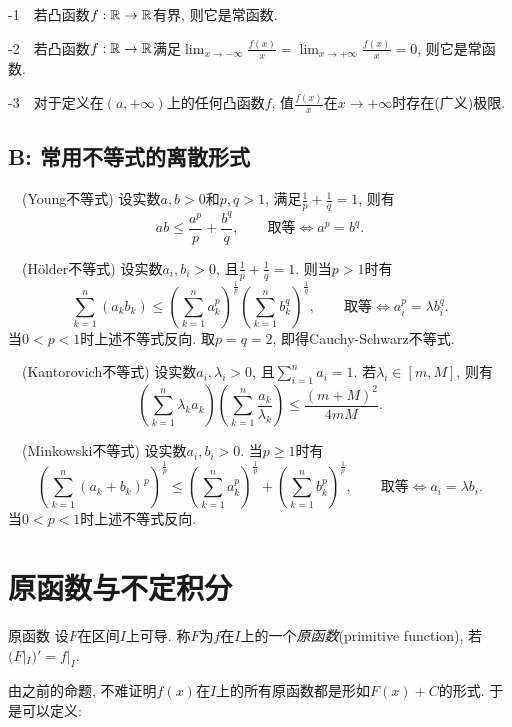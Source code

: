 -1~~若凸函数$f:\mathbb{R} \to \mathbb{R}$有界, 则它是常函数. 

-2~~若凸函数$f:\mathbb{R} \to \mathbb{R}$满足$\lim_{x \to -\infty} \frac{f(x)}{x} = \lim_{x \to +\infty} \frac{f(x)}{x} =0$, 则它是常函数. 

-3~~对于定义在$(a,+\infty)$上的任何凸函数$f$, 值$\frac{f(x)}{x}$在$x \to +\infty$时存在(广义)极限. 

\subsection*{B: 常用不等式的离散形式}

~~(Young不等式) 设实数$a,b>0$和$p,q>1$, 满足$\frac{1}{p} + \frac{1}{q} =1$, 则有$$ab \leq \frac{a^p}{p} + \frac{b^q}{q},\qquad \textit{取等} \Leftrightarrow a^p=b^q.$$

~~(Hölder不等式) 设实数$a_i,b_i>0$, 且$\frac{1}{p}+\frac{1}{q}=1$. 则当$p > 1$时有$$\sum_{k=1}^{n}(a_kb_k) \leq \left( \sum_{k=1}^{n} a_k^p \right)^{\frac{1}{p}} \left( \sum_{k=1}^{n} b_k^q \right)^{\frac{1}{q}},\qquad \textit{取等}\Leftrightarrow a_i^{p}=\lambda b_i^q. $$
当$0<p<1$时上述不等式反向. 取$p=q=2$, 即得Cauchy-Schwarz不等式. 
\vspace{1em}

~~(Kantorovich不等式) 设实数$a_i,\lambda _i>0$, 且$\sum_{i=1}^{n}a_i=1$. 若$\lambda _i \in [m,M]$, 则有$$\left( \sum_{k=1}^{n} \lambda _k a_k \right) \left( \sum_{k=1}^{n} \frac{a_k}{\lambda _k} \right) \leq \frac{(m+M)^2}{4mM}.$$

~~(Minkowski不等式) 设实数$a_i,b_i>0$. 当$p \geq 1$时有$$\left( \sum_{k=1}^{n} (a_k+b_k)^p \right)^{\frac{1}{p}} \leq \left( \sum_{k=1}^{n} a_k^p \right)^{\frac{1}{p}} + \left( \sum_{k=1}^{n} b_k^p \right)^{\frac{1}{p}},\qquad \textit{取等}\Leftrightarrow a_i=\lambda b_i.$$
当$0<p<1$时上述不等式反向. 

\newpage
\section{原函数与不定积分}

\begin{definition}{原函数}
	设$F$在区间$I$上可导. 称$F$为$f$在$I$上的一个\textit{原函数}(primitive function), 若$(F|_I)' = f|_I$. 
\end{definition}

由之前的命题, 不难证明$f(x)$在$I$上的所有原函数都是形如$F(x)+C$的形式. 于是可以定义:

